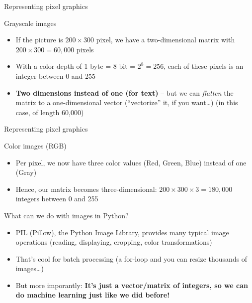 

\begin{frame}{Representing pixel graphics}
  \begin{block}{Grayscale images}
    \begin{itemize}
    \item If the picture is $200\times 300$ pixel, we have a two-dimensional matrix with $200\times 300 = 60,000$ pixels
    \item With a color depth of 1 byte = 8 bit = $2^8=256$, each of these pixels is an integer between 0 and 255
    \item \textbf{Two dimensions instead of one (for text)} -- but we can \emph{flatten} the matrix to a one-dimensional vector (``vectorize'' it, if you want\ldots) (in this case, of length 60,000)
    \end{itemize}
  \end{block}
\end{frame}


\begin{frame}{Representing pixel graphics}
  \begin{block}{Color images (RGB)}
    \begin{itemize}
    \item Per pixel, we now have three color values (Red, Green, Blue) instead of one (Gray)
    \item Hence, our matrix becomes three-dimensional: $200\times 300\times 3 = 180,000$ integers between 0 and 255
    \end{itemize}
  \end{block}
\end{frame}
  

\begin{frame}{What can we do with images in Python?}
  \begin{itemize}
  \item PIL (Pillow), the Python Image Library, provides many typical image operations (reading, displaying, cropping, color transformations)
  \item That's cool for batch processing (a for-loop and you can resize thousands of images\ldots)
  \item But more imporantly: \textbf{It's just a vector/matrix of integers, so we can do machine learning just like we did before!}
  \end{itemize}
\end{frame}

